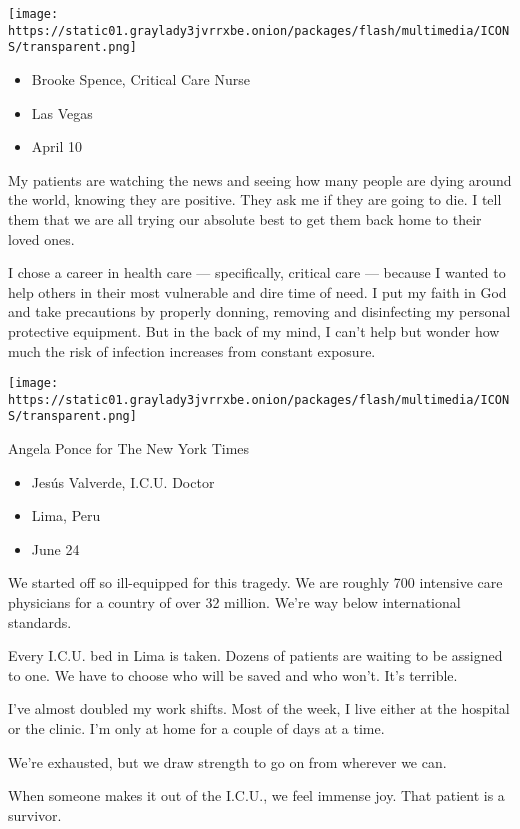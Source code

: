\texttt{[image: https://static01.graylady3jvrrxbe.onion/packages/flash/multimedia/ICONS/transparent.png]}

\begin{itemize}
\tightlist
\item
  Brooke Spence, Critical Care Nurse
\item
  Las Vegas
\item
  April 10
\end{itemize}

My patients are watching the news and seeing how many people are dying
around the world, knowing they are positive. They ask me if they are
going to die. I tell them that we are all trying our absolute best to
get them back home to their loved ones.

I chose a career in health care --- specifically, critical care ---
because I wanted to help others in their most vulnerable and dire time
of need. I put my faith in God and take precautions by properly donning,
removing and disinfecting my personal protective equipment. But in the
back of my mind, I can't help but wonder how much the risk of infection
increases from constant exposure.

\texttt{[image: https://static01.graylady3jvrrxbe.onion/packages/flash/multimedia/ICONS/transparent.png]}

Angela Ponce for The New York Times

\begin{itemize}
\tightlist
\item
  Jesús Valverde, I.C.U. Doctor
\item
  Lima, Peru
\item
  June 24
\end{itemize}

We started off so ill-equipped for this tragedy. We are roughly 700
intensive care physicians for a country of over 32 million. We're way
below international standards.

Every I.C.U. bed in Lima is taken. Dozens of patients are waiting to be
assigned to one. We have to choose who will be saved and who won't. It's
terrible.

I've almost doubled my work shifts. Most of the week, I live either at
the hospital or the clinic. I'm only at home for a couple of days at a
time.

We're exhausted, but we draw strength to go on from wherever we can.

When someone makes it out of the I.C.U., we feel immense joy. That
patient is a survivor.

